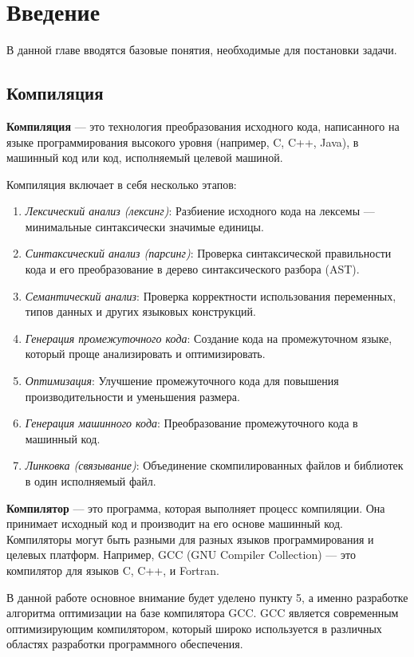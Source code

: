 \section{Введение}
\label{sec:Chapter0} 

В данной главе вводятся базовые понятия, необходимые для постановки задачи.

\subsection{Компиляция}
\textbf{Компиляция} — это технология преобразования исходного кода, написанного на языке программирования высокого уровня (например, C, C++, Java), в машинный код или код, исполняемый целевой машиной.

Компиляция включает в себя несколько этапов:
\begin{enumerate}
    \item \textit{Лексический анализ (лексинг)}: Разбиение исходного кода на лексемы — минимальные синтаксически значимые единицы.
    \item \textit{Синтаксический анализ (парсинг)}: Проверка синтаксической правильности кода и его преобразование в дерево синтаксического разбора (AST).
    \item \textit{Семантический анализ}: Проверка корректности использования переменных, типов данных и других языковых конструкций.
    \item \textit{Генерация промежуточного кода}: Создание кода на промежуточном языке, который проще анализировать и оптимизировать.
    \item \textit{Оптимизация}: Улучшение промежуточного кода для повышения производительности и уменьшения размера.
    \item \textit{Генерация машинного кода}: Преобразование промежуточного кода в машинный код.
    \item \textit{Линковка (связывание)}: Объединение скомпилированных файлов и библиотек в один исполняемый файл.
\end{enumerate}

\textbf{Компилятор} — это программа, которая выполняет процесс компиляции. Она принимает исходный код и производит на его основе машинный код. Компиляторы могут быть разными для разных языков программирования и целевых платформ. Например, GCC (GNU Compiler Collection) — это компилятор для языков C, C++, и Fortran. %

В данной работе основное внимание будет уделено пункту 5, а именно разработке алгоритма оптимизации на базе компилятора GCC. GCC является современным оптимизирующим компилятором, который широко используется в различных областях разработки программного обеспечения.

